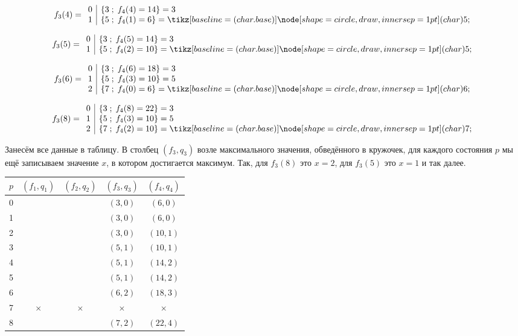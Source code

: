 \begin{enumerate}
	\[
	f_3(4) = \begin{array}{c|l}
		0 & \{3 \; ; \; f_4(4) = 14\} = 3 \\
		1 & \{5 \; ; \; f_4(1) = 6\} = \circled{5}
	\end{array}
	\]
	
	\[
	f_3(5) = \begin{array}{c|l}
		0 & \{3 \; ; \; f_4(5) = 14\} = 3 \\
		1 & \{5 \; ; \; f_4(2) = 10\} = \circled{5}
	\end{array}
	\]
	
	\[
	f_3(6) = \begin{array}{c|l}
		0 & \{3 \; ; \; f_4(6) = 18\} = 3 \\
		1 & \{5 \; ; \; f_4(3) = 10\} = 5 \\
		2 & \{7 \; ; \; f_4(0) = 6\} = \circled{6}
	\end{array}
	\]
	
	\[
	f_3(8) = \begin{array}{c|l}
		0 & \{3 \; ; \; f_4(8) = 22\} = 3 \\
		1 & \{5 \; ; \; f_4(3) = 10\} = 5 \\
		2 & \{7 \; ; \; f_4(2) = 10\} = \circled{7}
	\end{array}
	\]
	
	Занесём все данные в таблицу. В столбец $(f_3, q_3)$ возле максимального значения, обведённого в кружочек, для каждого состояния $p$ мы ещё записываем значение $x$, в котором достигается максимум. Так, для $f_3(8)$ это $x = 2$, для $f_3(5)$ это $x = 1$ и так далее.
	
	\begin{table}[H]
		\centering
		\begin{tabular}{ | c | c | c | c | c | } 
			\hline
			$p$ & $(f_1, q_1)$ & $(f_2, q_2)$ & $(f_3, q_3)$ & $(f_4, q_4)$ \\ 
			\hline
			0 & & & $(3, 0)$ & $(6, 0)$ \\\hline
			1 & & & $(3, 0)$ & $(6, 0)$ \\\hline
			2 & & & $(3, 0)$ & $(10, 1)$ \\\hline
			3 & & & $(5, 1)$ & $(10, 1)$ \\\hline
			4 & & & $(5, 1)$ & $(14, 2)$ \\\hline
			5 & & & $(5, 1)$ & $(14, 2)$ \\\hline
			6 & & & $(6, 2)$ & $(18, 3)$ \\\hline
			7 & $\times$ & $\times$   & $\times$ & $\times$ \\\hline
			8 & & & $(7, 2)$ & $(22, 4)$ \\\hline
		\end{tabular}
	\end{table}
	

\end{enumerate}
